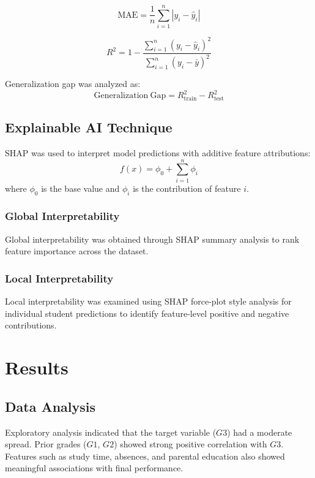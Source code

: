 \documentclass[12pt,a4paper]{article}
\begin{document}
\begin{equation}
\mathrm{MAE} = \frac{1}{n}\sum_{i=1}^{n}|y_i - \hat{y}_i|
\end{equation}

\begin{equation}
R^2 = 1 - \frac{\sum_{i=1}^{n}(y_i - \hat{y}_i)^2}{\sum_{i=1}^{n}(y_i - \bar{y})^2}
\end{equation}

Generalization gap was analyzed as:
\begin{equation}
\mathrm{Generalization\ Gap} = R^2_{\mathrm{train}} - R^2_{\mathrm{test}}
\end{equation}

\subsection{Explainable AI Technique}
SHAP was used to interpret model predictions with additive feature attributions:
\begin{equation}
f(x) = \phi_0 + \sum_{i=1}^{n}\phi_i
\end{equation}
where $\phi_0$ is the base value and $\phi_i$ is the contribution of feature $i$.

\subsubsection{Global Interpretability}
Global interpretability was obtained through SHAP summary analysis to rank feature importance across the dataset.

\subsubsection{Local Interpretability}
Local interpretability was examined using SHAP force-plot style analysis for individual student predictions to identify feature-level positive and negative contributions.

\section{Results}
\subsection{Data Analysis}
Exploratory analysis indicated that the target variable ($G3$) had a moderate spread. Prior grades ($G1$, $G2$) showed strong positive correlation with $G3$. Features such as study time, absences, and parental education also showed meaningful associations with final performance.
\end{document}
